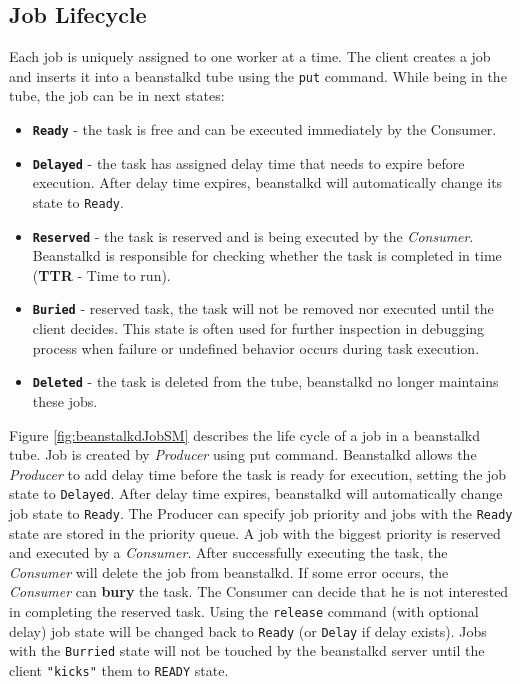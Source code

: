     \subsection{Job Lifecycle}
    Each job is uniquely assigned to one worker at a time. The client creates a job and inserts it into a beanstalkd tube using the \texttt{put} command. While being in the tube, the job can be in next states\cite{beanstalkdProtocol}:
    \begin{itemize}
        \item \texttt{\textbf{Ready}} - the task is free and can be executed immediately by the Consumer.
        \item \texttt{\textbf{Delayed}} - the task has assigned delay time that needs to expire before execution. After delay time expires, beanstalkd will automatically change its state to \texttt{Ready}.
        \item \texttt{\textbf{Reserved}} - the task is reserved and is being executed by the \textit{Consumer}. Beanstalkd is responsible for checking whether the task is completed in time (\textbf{TTR} - Time to run).
        \item \texttt{\textbf{Buried}} - reserved task, the task will not be removed nor executed until the client decides. This state is often used for further inspection in debugging process when failure or undefined behavior occurs during task execution.
        \item \texttt{\textbf{Deleted}} - the task is deleted from the tube, beanstalkd no longer maintains these jobs.
    \end{itemize}

    Figure \ref{fig:beanstalkdJobSM} describes the life cycle of a job in a beanstalkd tube. Job is created by \textit{Producer} using put command. Beanstalkd allows the \textit{Producer} to add delay time before the task is ready for execution, setting the job state to \texttt{Delayed}. After delay time expires, beanstalkd will automatically change job state to \texttt{Ready}. The Producer can specify job priority and jobs with the \texttt{Ready} state are stored in the priority queue. A job with the biggest priority is reserved and executed by a \textit{Consumer}. After successfully executing the task, the \textit{Consumer} will delete the job from beanstalkd. If some error occurs, the \textit{Consumer} can \textbf{bury} the task. The Consumer can decide that he is not interested in completing the reserved task. Using the \texttt{release} command (with optional delay) job state will be changed back to \texttt{Ready} (or \texttt{Delay} if delay exists). Jobs with the \texttt{Burried} state will not be touched by the beanstalkd server until the client \texttt{"kicks"} them to \texttt{READY} state.

